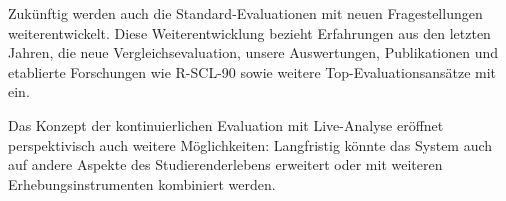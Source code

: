 \documentclass[12pt,a4paper,oneside]{article}
\begin{document}
Zukünftig werden auch die Standard-Evaluationen mit neuen Fragestellungen weiterentwickelt. Diese Weiterentwicklung bezieht Erfahrungen aus den letzten Jahren, die neue Vergleichsevaluation, unsere Auswertungen, Publikationen und etablierte Forschungen wie R-SCL-90 sowie weitere Top-Evaluationsansätze mit ein.

Das Konzept der kontinuierlichen Evaluation mit Live-Analyse eröffnet perspektivisch auch weitere Möglichkeiten: Langfristig könnte das System auch auf andere Aspekte des Studierenderlebens erweitert oder mit weiteren Erhebungsinstrumenten kombiniert werden.


\newpage
\printbibliography


\end{document}
